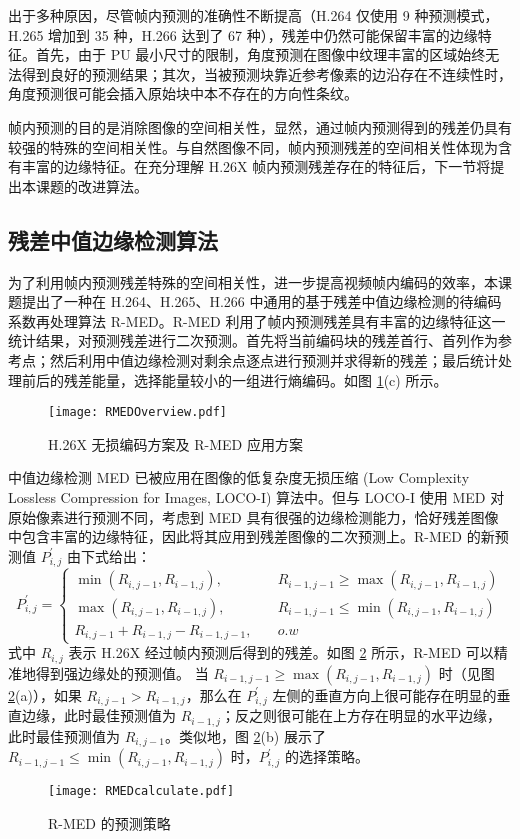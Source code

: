出于多种原因，尽管帧内预测的准确性不断提高（H.264 仅使用 9 种预测模式，H.265 增加到 35 种，H.266 达到了 67 种），残差中仍然可能保留丰富的边缘特征。首先，由于 PU 最小尺寸的限制，角度预测在图像中纹理丰富的区域始终无法得到良好的预测结果；其次，当被预测块靠近参考像素的边沿存在不连续性时，角度预测很可能会插入原始块中本不存在的方向性条纹。

帧内预测的目的是消除图像的空间相关性，显然，通过帧内预测得到的残差仍具有较强的特殊的空间相关性。与自然图像不同，帧内预测残差的空间相关性体现为含有丰富的边缘特征。在充分理解 H.26X 帧内预测残差存在的特征后，下一节将提出本课题的改进算法。

\subsection{残差中值边缘检测算法}
为了利用帧内预测残差特殊的空间相关性，进一步提高视频帧内编码的效率，本课题提出了一种在 H.264、H.265、H.266 中通用的基于残差中值边缘检测的待编码系数再处理算法 R-MED。R-MED 利用了帧内预测残差具有丰富的边缘特征这一统计结果，对预测残差进行二次预测。首先将当前编码块的残差首行、首列作为参考点；然后利用中值边缘检测对剩余点逐点进行预测并求得新的残差；最后统计处理前后的残差能量，选择能量较小的一组进行熵编码。如图 \ref{fig:RMEDOverview}(c) 所示。
\begin{figure}[hbt]
    \centering
    \texttt{[image: RMEDOverview.pdf]}
    \caption{H.26X 无损编码方案及 R-MED 应用方案}
    \label{fig:RMEDOverview}
\end{figure}

中值边缘检测 MED 已被应用在图像的低复杂度无损压缩 (Low Complexity Lossless Compression for Images, LOCO-I) 算法中。但与 LOCO-I 使用 MED 对原始像素进行预测不同，考虑到 MED 具有很强的边缘检测能力，恰好残差图像中包含丰富的边缘特征，因此将其应用到残差图像的二次预测上。R-MED 的新预测值 $P_{i,j}^{'}$ 由下式给出：
\begin{equation}
    P_{i,j}^{'}=\left\{
    \begin{aligned}
        \min(R_{i,j-1},R_{i-1,j}), \quad       & R_{i-1,j-1} \geqslant \max(R_{i,j-1},R_{i-1,j}) \\
        \max(R_{i,j-1},R_{i-1,j}), \quad       & R_{i-1,j-1} \leqslant \min(R_{i,j-1},R_{i-1,j}) \\
        R_{i,j-1}+R_{i-1,j}-R_{i-1,j-1}, \quad & o.w
    \end{aligned}
    \right.
    \label{equ:LOCO-i}
\end{equation}
式中 $R_{i,j}$ 表示 H.26X 经过帧内预测后得到的残差。如图 \ref{fig:RMEDcalculate} 所示，R-MED 可以精准地得到强边缘处的预测值。
当 $R_{i-1,j-1} \geqslant \max(R_{i,j-1},R_{i-1,j})$ 时（见图 \ref{fig:RMEDcalculate}(a)），如果 $R_{i,j-1}>R_{i-1,j}$，那么在 $P_{i,j}^{'}$ 左侧的垂直方向上很可能存在明显的垂直边缘，此时最佳预测值为 $R_{i-1,j}$；反之则很可能在上方存在明显的水平边缘，此时最佳预测值为 $R_{i,j-1}$。类似地，图 \ref{fig:RMEDcalculate}(b) 展示了 $R_{i-1,j-1} \leqslant \min(R_{i,j-1},R_{i-1,j})$ 时，$P_{i,j}^{'}$ 的选择策略。
\begin{figure}[hbt]
    \centering
    \texttt{[image: RMEDcalculate.pdf]}
    \caption{R-MED 的预测策略}
    \label{fig:RMEDcalculate}
\end{figure}

